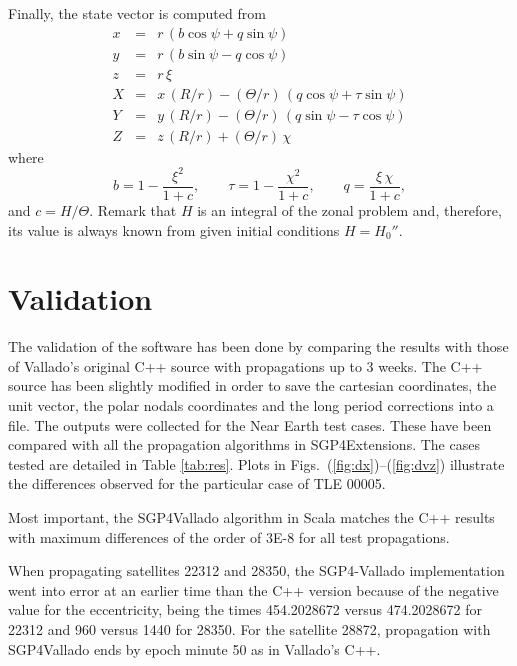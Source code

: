 \documentclass{article}
\begin{document}
Finally, the state vector is computed from
\begin{eqnarray*} \label{ns2x}
x &=& r\,(b\cos\psi+q\sin\psi) \\ \label{ns2y}
y &=& r\,(b\sin\psi-q\cos\psi) \\
z &=& r\,\xi \\
X &=& x\,(R/r) %
 - ({\Theta}/{r})\,(q\cos\psi+\tau\sin\psi) \\ \label{ns2Y}
Y &=& y\,(R/r) %
 - ({\Theta}/{r})\,(q\sin\psi-\tau\cos\psi) \\  \label{ns2zz}
Z &=& z\,(R/r)+(\Theta/r)\,\chi
\end{eqnarray*}
where
\[%
b=1-\frac{\xi^2}{1+c}, \qquad
\tau=1 - \frac{\chi^2}{1 + c}, \qquad
q=\frac{\xi\,\chi}{1+c},
\]%
and $c=H/\Theta$. Remark that $H$ is an integral of the zonal problem and, therefore, its value is always known from given initial conditions $H=H_0''$.






\section{Validation} \label{sec:validation}

The validation of the software has been done by comparing the results with those
of Vallado's original C++ source with propagations up to 3 weeks. The C++ source has been slightly modified in order
to save the cartesian coordinates, the unit vector, the polar nodals coordinates
and the long period corrections into a file. The outputs were collected
for the Near Earth test cases. These have been compared with all the propagation
algorithms in SGP4Extensions. {\color{red} The cases tested are detailed in Table \ref{tab:res}. Plots in Figs.~(\ref{fig:dx})--(\ref{fig:dvz}) illustrate the differences observed for the particular case of TLE 00005}.

Most important, the SGP4Vallado algorithm in Scala matches the C++ results with maximum differences
of the order of 3E-8 for all test propagations.

When propagating satellites 22312 and 28350, the SGP4-Vallado implementation went into error at an earlier time
than the C++ version because of the negative value for the eccentricity, being the times 454.2028672 versus 474.2028672 for 22312 and 960 versus 1440 for 28350.
For the satellite 28872, propagation with SGP4Vallado ends by epoch minute 50 as in Vallado's C++.
\end{document}
